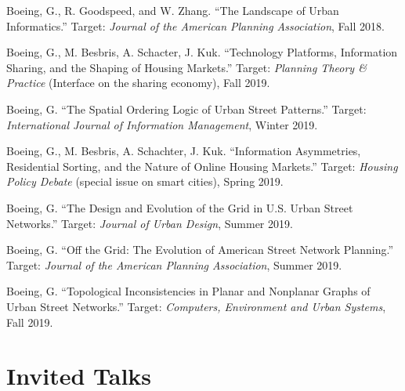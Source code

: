 \documentclass[12pt,letterpaper]{report}
\begin{document}
	\begin{tablist}
		
		\item[\the\year] \tab Boeing, G., R. Goodspeed, and W. Zhang. \enquote{The Landscape of Urban Informatics.} Target: \textit{Journal of the American Planning Association}, Fall 2018.
		
		\item[\the\year] \tab Boeing, G., M. Besbris, A. Schacter, J. Kuk. \enquote{Technology Platforms, Information Sharing, and the Shaping of Housing Markets.} Target: \textit{Planning Theory \& Practice} (Interface on the sharing economy), Fall 2019.
		
		\item[\the\year] \tab Boeing, G. \enquote{The Spatial Ordering Logic of Urban Street Patterns.} Target: \textit{International Journal of Information Management}, Winter 2019.
		
		\item[\the\year] \tab Boeing, G., M. Besbris, A. Schachter, J. Kuk. \enquote{Information Asymmetries, Residential Sorting, and the Nature of Online Housing Markets.} Target: \textit{Housing Policy Debate} (special issue on smart cities), Spring 2019.
		
		\item[\the\year] \tab Boeing, G. \enquote{The Design and Evolution of the Grid in U.S. Urban Street Networks.} Target: \textit{Journal of Urban Design}, Summer 2019.
		
		\item[\the\year] \tab Boeing, G. \enquote{Off the Grid: The Evolution of American Street Network Planning.} Target: \textit{Journal of the American Planning Association}, Summer 2019.
		
		\item[\the\year] \tab Boeing, G. \enquote{Topological Inconsistencies in Planar and Nonplanar Graphs of Urban Street Networks.} Target: \textit{Computers, Environment and Urban Systems}, Fall 2019.
		
	\end{tablist}
	
	
	
	\section*{Invited Talks}
	
\end{document}
